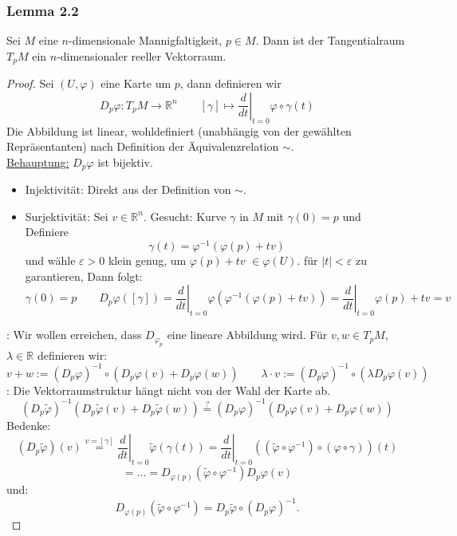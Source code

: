 \documentclass[fleqn, 12pt, letterpaper]{article}
\begin{document}
\subsubsection*{Lemma 2.2} Sei \( M \) eine \( n \)-dimensionale Mannigfaltigkeit, \( p \in M \). Dann ist der Tangentialraum \( T_pM \) ein \( n \)-dimensionaler reeller Vektorraum.
\begin{proof}
    Sei \((U, \varphi)\) eine Karte um \( p \), dann definieren wir
    \[
    D_p\varphi: T_pM \to \mathbb{R}^n \qquad [\gamma] \mapsto \left. \frac{d}{dt} \right|_{t=0} \varphi\circ\gamma(t)
    \]
    Die Abbildung ist linear, wohldefiniert (unabhängig von der gewählten Repräsentanten) nach Definition der Äquivalenzrelation \(\sim\).\\
    
    \underline{Behauptung:} \(D_p\varphi\) ist bijektiv.
    \begin{itemize}
        \item Injektivität: Direkt aus der Definition von \(\sim\).
        \item Surjektivität: Sei \( v \in \mathbb{R}^n \). Gesucht: Kurve \(\gamma\) in \(M\) mit \(\gamma(0) = p\) und \\
        Definiere 
        \[
        \gamma(t) = \varphi^{-1}(\varphi(p)+tv)
        \]
        und wähle \(\varepsilon > 0\) klein genug, um $\varphi(p)+tv$ \(\in \varphi(U)\). für \(|t| < \varepsilon\) zu garantieren, Dann folgt:
        \[
        \gamma(0) = p \qquad D_p\varphi([\gamma]) = \left. \frac{d}{dt} \right|_{t=0} \varphi(\varphi^{-1}(\varphi(p)+tv)) =  \left. \frac{d}{dt} \right|_{t=0} \varphi(p)+tv = v
        \]
    \end{itemize}
    : Wir wollen erreichen, dass \( D_{\varphi_p} \) eine lineare Abbildung wird. Für \( v, w \in T_pM \), \( \lambda \in \mathbb{R} \) definieren wir:
    \[
    v + w := (D_p\varphi)^{-1}\circ (D_p\varphi(v)+D_p\varphi(w)) \qquad \lambda \cdot v := (D_p\varphi)^{-1}\circ(\lambda D_p\varphi(v))
    \]
    : Die Vektorraumstruktur hängt nicht von der Wahl der Karte ab.
    \[
    (D_p{\tilde{\varphi}})^{-1} \left( D_p\tilde{\varphi}(v) +     D_p\tilde{\varphi}(w) \right) \overset{?}{=} (D_p\varphi)^{-1} \left( D_p{\varphi}    (v) + D_p{\varphi}(w) \right)
    \]
    Bedenke:
\[
(D_p \widetilde{\varphi})(v) \overset{v = [\gamma]}{=} 
\left. \frac{d}{dt} \right|_{t=0} \widetilde{\varphi}(\gamma(t)) = 
\left. \frac{d}{dt} \right|_{t=0} \left( (\widetilde{\varphi} \circ \varphi^{-1}) \circ (\varphi \circ \gamma) \right)(t)
\]
\[
=\dots= D_{\varphi(p)} (\widetilde{\varphi} \circ \varphi^{-1}) D_p\varphi(v)
\]
und:
\[
D_{\varphi(p)}(\widetilde{\varphi} \circ \varphi^{-1}) = D_p\widetilde{\varphi} \circ (D_p\varphi)^{-1}.
\]

\end{proof}
\end{document}
